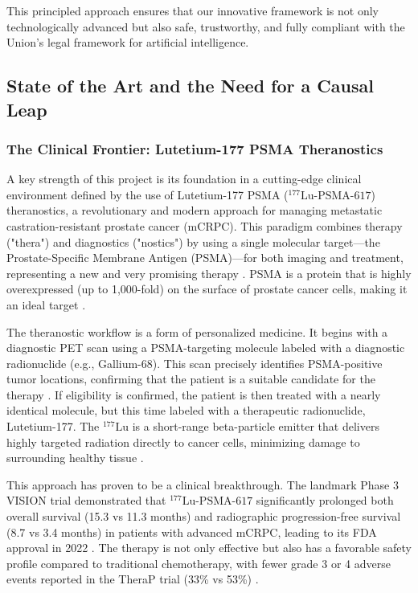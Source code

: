 \documentclass[11pt, a4paper]{article}
\begin{document}
This principled approach ensures that our innovative framework is not only technologically advanced but also safe, trustworthy, and fully compliant with the Union's legal framework for artificial intelligence.

\subsection{State of the Art and the Need for a Causal Leap}
\subsubsection{The Clinical Frontier: Lutetium-177 PSMA Theranostics}
A key strength of this project is its foundation in a cutting-edge clinical environment defined by the use of Lutetium-177 PSMA (${}^{177}\text{Lu-PSMA-617}$) theranostics, a revolutionary and modern approach for managing metastatic castration-resistant prostate cancer (mCRPC). This paradigm combines therapy ("thera") and diagnostics ("nostics") by using a single molecular target—the Prostate-Specific Membrane Antigen (PSMA)—for both imaging and treatment, representing a new and very promising therapy \cite{HennrichEder2022}. PSMA is a protein that is highly overexpressed (up to 1,000-fold) on the surface of prostate cancer cells, making it an ideal target \cite{HennrichEder2022, LingBlois2022}.

The theranostic workflow is a form of personalized medicine. It begins with a diagnostic PET scan using a PSMA-targeting molecule labeled with a diagnostic radionuclide (e.g., Gallium-68). This scan precisely identifies PSMA-positive tumor locations, confirming that the patient is a suitable candidate for the therapy \cite{HennrichEder2022, KaewputVinjamuri2022}. If eligibility is confirmed, the patient is then treated with a nearly identical molecule, but this time labeled with a therapeutic radionuclide, Lutetium-177. The ${}^{177}\text{Lu}$ is a short-range beta-particle emitter that delivers highly targeted radiation directly to cancer cells, minimizing damage to surrounding healthy tissue \cite{HennrichEder2022, SadaghianiSheikhbahaei2022}.

This approach has proven to be a clinical breakthrough. The landmark Phase 3 VISION trial demonstrated that ${}^{177}\text{Lu-PSMA-617}$ significantly prolonged both overall survival (15.3 vs 11.3 months) and radiographic progression-free survival (8.7 vs 3.4 months) in patients with advanced mCRPC, leading to its FDA approval in 2022 \cite{TschanBorgna2022, ChandranFigg2022, RamnaraignSartor2023, JangKendi2023}. The therapy is not only effective but also has a favorable safety profile compared to traditional chemotherapy, with fewer grade 3 or 4 adverse events reported in the TheraP trial (33\% vs 53\%) \cite{HofmanEmmett2024, PatellKurian2023}.
\end{document}
